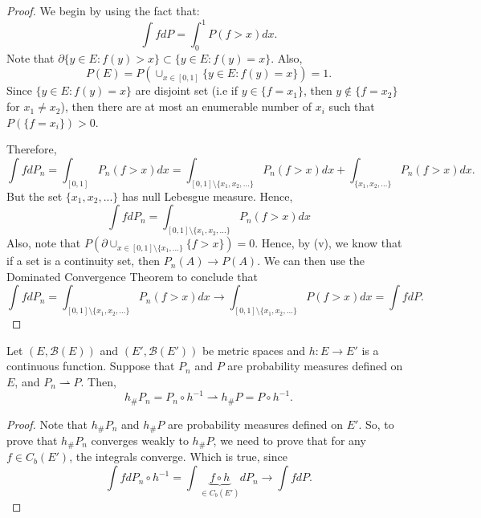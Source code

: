 \begin{proof}
	We begin by using the fact that:
	\begin{displaymath}
		\int f dP = \int_0^1 P(f > x)dx.
	\end{displaymath}
	Note that
	$\partial \{y \in E: f(y) >x \} \subset \{y \in E: f(y) = x\}$.
	Also,
	\begin{displaymath}
		P(E) = P(\cup_{x \in [0,1]} \{y \in E : f(y) = x\}) =1.
	\end{displaymath}
	Since $\{y \in E : f(y) = x\}$ are disjoint set (i.e
	if $y \in \{f = x_1\}$, then $y \notin \{f = x_2\}$ for $x_1\neq x_2$),
	then there are at most an enumerable number of $x_i$ such that
	$P(\{f = x_i\}) > 0$.

	Therefore,
	\begin{displaymath}
		\int f dP_n =
		\int_{[0,1]} P_n(f > x) dx =
		\int_{[0,1]\setminus \{x_1,x_2,...\}}P_n(f > x) dx+
		\int_{\{x_1,x_2,...\}}P_n(f > x) dx.
	\end{displaymath}
	But the set $\{x_1,x_2,...\}$ has null Lebesgue measure. Hence,
	\begin{displaymath}
		\int f dP_n =
		\int_{[0,1]\setminus \{x_1,x_2,...\}}P_n(f > x) dx
	\end{displaymath}
	Also,
	note that $P(\partial \cup_{x \in [0,1] \setminus \{x_1,...\}} \{f > x\}) = 0$.
	Hence, by (v), we know that if a set is a continuity set, then
	$P_n(A) \to P(A)$. We can then use the Dominated Convergence
	Theorem to conclude that
	\begin{displaymath}
		\int f dP_n =
		\int_{[0,1]\setminus \{x_1,x_2,...\}}P_n(f > x) dx \to
		\int_{[0,1]\setminus \{x_1,x_2,...\}}P(f > x) dx =
		\int f dP.
	\end{displaymath}

\end{proof}

\begin{proposition}
	Let $(E, \mathcal B(E))$ and $(E', \mathcal B(E'))$
	be metric spaces and  $h:E \to E'$ is a continuous function.
	Suppose that $P_n$ and $P$ are probability measures
	defined on $E$, and $P_n \rightharpoonup P$.
	Then,
	\begin{equation}
		h_\# P_{n} = P_{n} \circ h^{-1} \rightharpoonup
		h_\# P = P \circ h^{-1}.
	\end{equation}
	\label{prop:contpushforward}
\end{proposition}

\begin{proof}
	Note that $h_\# P_n$ and $h_\# P$ are probability measures
	defined on $E'$. So, to prove that $h_\# P_n$
	converges weakly to $h_\# P$, we need to prove that for any
	$f \in C_b(E')$, the integrals converge. Which is true, since
	\begin{displaymath}
		\int f dP_n \circ h^{-1} = \int \underbrace{f \circ h}_{\in C_b(E')} dP_n \to
		\int f dP.
	\end{displaymath}
\end{proof}

